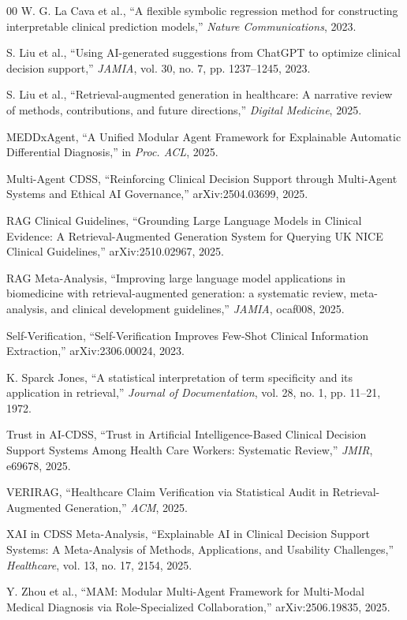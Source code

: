 \documentclass[conference]{IEEEtran}
\begin{document}
\begin{thebibliography}{00}
 W. G. La Cava et al., ``A flexible symbolic regression method for constructing interpretable clinical prediction models,'' \textit{Nature Communications}, 2023.

 S. Liu et al., ``Using AI-generated suggestions from ChatGPT to optimize clinical decision support,'' \textit{JAMIA}, vol. 30, no. 7, pp. 1237--1245, 2023.

 S. Liu et al., ``Retrieval-augmented generation in healthcare: A narrative review of methods, contributions, and future directions,'' \textit{Digital Medicine}, 2025.

 MEDDxAgent, ``A Unified Modular Agent Framework for Explainable Automatic Differential Diagnosis,'' in \textit{Proc. ACL}, 2025.

 Multi-Agent CDSS, ``Reinforcing Clinical Decision Support through Multi-Agent Systems and Ethical AI Governance,'' arXiv:2504.03699, 2025.

 RAG Clinical Guidelines, ``Grounding Large Language Models in Clinical Evidence: A Retrieval-Augmented Generation System for Querying UK NICE Clinical Guidelines,'' arXiv:2510.02967, 2025.

 RAG Meta-Analysis, ``Improving large language model applications in biomedicine with retrieval-augmented generation: a systematic review, meta-analysis, and clinical development guidelines,'' \textit{JAMIA}, ocaf008, 2025.

 Self-Verification, ``Self-Verification Improves Few-Shot Clinical Information Extraction,'' arXiv:2306.00024, 2023.

 K. Sparck Jones, ``A statistical interpretation of term specificity and its application in retrieval,'' \textit{Journal of Documentation}, vol. 28, no. 1, pp. 11--21, 1972.

 Trust in AI-CDSS, ``Trust in Artificial Intelligence-Based Clinical Decision Support Systems Among Health Care Workers: Systematic Review,'' \textit{JMIR}, e69678, 2025.

 VERIRAG, ``Healthcare Claim Verification via Statistical Audit in Retrieval-Augmented Generation,'' \textit{ACM}, 2025.

 XAI in CDSS Meta-Analysis, ``Explainable AI in Clinical Decision Support Systems: A Meta-Analysis of Methods, Applications, and Usability Challenges,'' \textit{Healthcare}, vol. 13, no. 17, 2154, 2025.

 Y. Zhou et al., ``MAM: Modular Multi-Agent Framework for Multi-Modal Medical Diagnosis via Role-Specialized Collaboration,'' arXiv:2506.19835, 2025.

\end{thebibliography}
\end{document}
